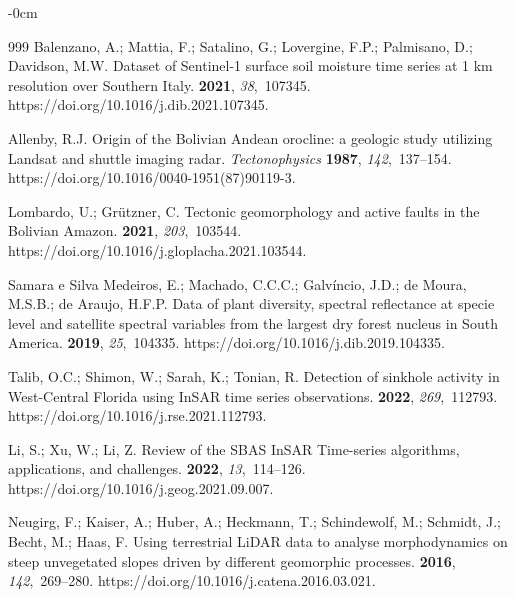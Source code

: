 \documentclass[data,article,accept,pdftex,moreauthors]{Definitions/mdpi}
\begin{document}
{\begin{adjustwidth}{-\extralength}{0cm}
\begin{thebibliography}{999}
Balenzano, A.; Mattia, F.; Satalino, G.; Lovergine, F.P.; Palmisano, D.;
 Davidson, M.W.
\newblock Dataset of Sentinel-1 surface soil moisture time series at 1 km
 resolution over Southern Italy.
 {\bf 2021}, {\em 38},~107345.
https://doi.org/10.1016/j.dib.2021.107345.

Allenby, R.J. %
Origin of the Bolivian Andean orocline: a geologic study utilizing Landsat and shuttle imaging radar. {\em Tectonophysics} {\bf 1987}, {\em 142},~137--154. https://doi.org/10.1016/0040-1951(87)90119-3.

Lombardo, U.; Gr\"utzner, C.
\newblock Tectonic geomorphology and active faults in the Bolivian Amazon.
 {\bf 2021}, {\em 203},~103544.
https://doi.org/10.1016/j.gloplacha.2021.103544.

{Samara e Silva Medeiros}, E.; Machado, C.C.C.; Galvíncio, J.D.; {de Moura},
 M.S.B.; {de Araujo}, H.F.P.
\newblock Data of plant diversity, spectral reflectance at specie level and
 satellite spectral variables from the largest dry forest nucleus in South
 America.
 {\bf 2019}, {\em 25},~104335.
https://doi.org/10.1016/j.dib.2019.104335.

Talib, O.C.; Shimon, W.; Sarah, K.; Tonian, R.
\newblock Detection of sinkhole activity in West-Central Florida using InSAR
 time series observations.
 {\bf 2022}, {\em 269},~112793.
https://doi.org/10.1016/j.rse.2021.112793.

Li, S.; Xu, W.; Li, Z.
\newblock Review of the SBAS InSAR Time-series algorithms, applications, and
 challenges.
 {\bf 2022}, {\em 13},~114--126. https://doi.org/10.1016/j.geog.2021.09.007. %

Neugirg, F.; Kaiser, A.; Huber, A.; Heckmann, T.; Schindewolf, M.; Schmidt, J.;
 Becht, M.; Haas, F.
\newblock Using terrestrial LiDAR data to analyse morphodynamics on steep
 unvegetated slopes driven by different geomorphic processes.
 {\bf 2016}, {\em 142},~269--280.
https://doi.org/10.1016/j.catena.2016.03.021.


\end{thebibliography}
\end{adjustwidth}}
\end{document}
